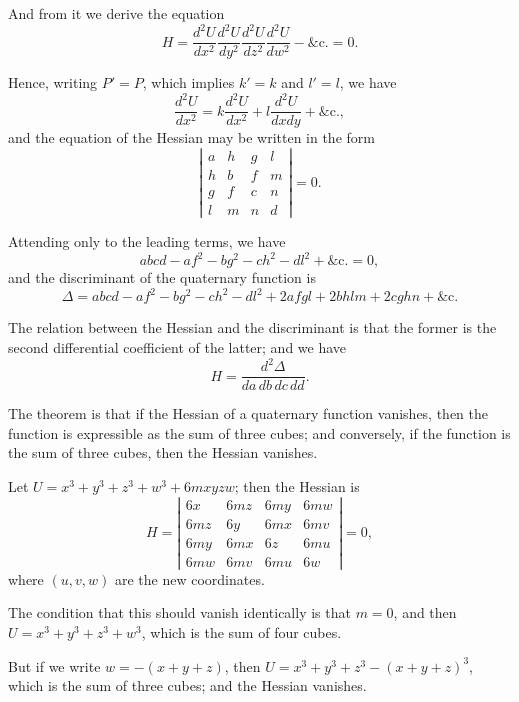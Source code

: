 \documentclass[11pt,a4paper]{book}
\begin{document}
And from it we derive the equation
\[
H = \frac{d^2U}{dx^2}\frac{d^2U}{dy^2}\frac{d^2U}{dz^2}\frac{d^2U}{dw^2} - \&\text{c.} = 0.
\]

\newpage

Hence, writing $P' = P$, which implies $k' = k$ and $l' = l$, we have
\[
\frac{d^2U}{dx^2} = k\frac{d^2U}{dx^2} + l\frac{d^2U}{dxdy} + \&\text{c.},
\]
and the equation of the Hessian may be written in the form
\[
\left| \begin{array}{cccc}
a & h & g & l \\
h & b & f & m \\
g & f & c & n \\
l & m & n & d
\end{array} \right| = 0.
\]

Attending only to the leading terms, we have
\[
abcd - af^2 - bg^2 - ch^2 - dl^2 + \&\text{c.} = 0,
\]
and the discriminant of the quaternary function is
\[
\Delta = abcd - af^2 - bg^2 - ch^2 - dl^2 + 2afgl + 2bhlm + 2cghn + \&\text{c.}
\]

The relation between the Hessian and the discriminant is that the former is the second differential coefficient of the latter; and we have
\[
H = \frac{d^2\Delta}{da\,db\,dc\,dd}.
\]

\newpage

The theorem is that if the Hessian of a quaternary function vanishes, then the function is expressible as the sum of three cubes; and conversely, if the function is the sum of three cubes, then the Hessian vanishes.

Let $U = x^3 + y^3 + z^3 + w^3 + 6mxyzw$; then the Hessian is
\[
H = \left| \begin{array}{cccc}
6x & 6mz & 6my & 6mw \\
6mz & 6y & 6mx & 6mv \\
6my & 6mx & 6z & 6mu \\
6mw & 6mv & 6mu & 6w
\end{array} \right| = 0,
\]
where $(u, v, w)$ are the new coordinates.

The condition that this should vanish identically is that $m = 0$, and then $U = x^3 + y^3 + z^3 + w^3$, which is the sum of four cubes.

But if we write $w = -(x + y + z)$, then $U = x^3 + y^3 + z^3 - (x + y + z)^3$, which is the sum of three cubes; and the Hessian vanishes.

\newpage
\end{document}
